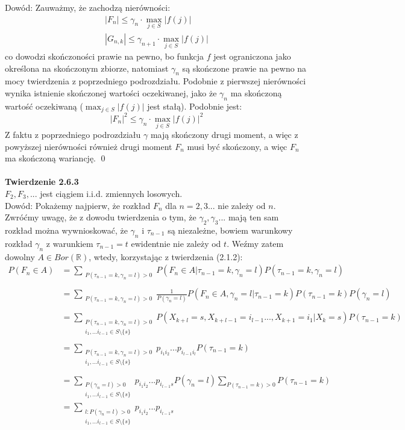 \documentclass[a4paper]{article}
\begin{document}
Dowód: Zauważmy, że zachodzą nierówności:
\begin{align*}
    |F_n| \leq \gamma_n \cdot \max_{j \in S} |f(j)|\\
    |G_{n,k}| \leq \gamma_{n+1} \cdot \max_{j \in S} |f(j)|
\end{align*}
co dowodzi skończoności prawie na pewno, bo funkcja $f$ jest ograniczona jako określona na skończonym zbiorze, natomiast $\gamma_n$ są skończone prawie na pewno na mocy twierdzenia z poprzedniego podrozdziału. Podobnie z pierwszej nierówności wynika istnienie skończonej wartości oczekiwanej, jako że $\gamma_n$ ma skończoną wartość oczekiwaną ($\max_{j \in S} |f(j)|$ jest stałą). Podobnie jest:
$$|F_n|^2 \leq \gamma_n \cdot \max_{j \in S} |f(j)|^2$$
Z faktu z poprzedniego podrozdziału $\gamma$ mają skończony drugi moment, a więc z powyższej nierówności również drugi moment $F_n$ musi być skończony, a więc $F_n$ ma skończoną wariancję. \qed
\\\\
\textbf{Twierdzenie 2.6.3}\\
$F_2, F_3,...$ jest ciągiem i.i.d. zmiennych losowych.\\
Dowód: Pokażemy najpierw, że rozkład $F_n$ dla $n=2,3...$ nie zależy od $n$. Zwróćmy uwagę, że z dowodu twierdzenia o tym, że $\gamma_2, \gamma_3...$ mają ten sam rozkład można wywnioskować, że $\gamma_n$ i $\tau_{n-1}$ są niezależne, bowiem warunkowy rozkład $\gamma_n$ z warunkiem $\tau_{n-1} = t$ ewidentnie nie zależy od $t$. Weźmy zatem dowolny $A \in Bor(\mathbb{R})$, wtedy, korzystając z twierdzenia (2.1.2):
\begin{align*}
 P(F_n \in A) &= \sum\limits_{\substack{P(\tau_{n-1} = k, \gamma_{n} = l) > 0}} P(F_n \in A |\tau_{n-1} = k, \gamma_{n} = l)P(\tau_{n-1} = k, \gamma_{n} = l)\\\\
 &=\sum\limits_{\substack{P(\tau_{n-1} = k, \gamma_{n} = l) > 0}} \frac{1}{P(\gamma_{n} = l)} P(F_n \in A, \gamma_{n} = l |\tau_{n-1} = k)P(\tau_{n-1} = k) P(\gamma_{n} = l)\\\\
 &=\sum\limits_{\substack{P(\tau_{n-1} = k, \gamma_{n} = l) > 0\\i_1, ... i_{l-1} \in S\setminus \{s\}}} P(X_{k+l} = s, X_{k+l-1} = i_{l-1} ..., X_{k+1} = i_1|X_{k} = s)P(\tau_{n-1} = k)\\\\
 &= \sum\limits_{\substack{P(\tau_{n-1} = k, \gamma_{n} = l) > 0\\i_1, ... i_{l-1} \in S\setminus \{s\}}} p_{i_1 i_2} ... p_{i_{l-1}i_l}P(\tau_{n-1} = k) \\\\
 &=\sum\limits_{\substack{P(\gamma_{n} = l) > 0\\i_1, ... i_{l-1} \in S\setminus \{s\}}} p_{i_1 i_2} ... p_{i_{l-1}s}P(\gamma_n = l) \sum\limits_{P(\tau_{n-1} = k) > 0} P(\tau_{n-1} = k)\\
 &= \sum\limits_{\substack{l: P(\gamma_{n} = l) > 0\\i_1, ... i_{l-1} \in S\setminus \{s\}}} p_{i_1 i_2} ... p_{i_{l-1}s}
\end{align*}
\end{document}
